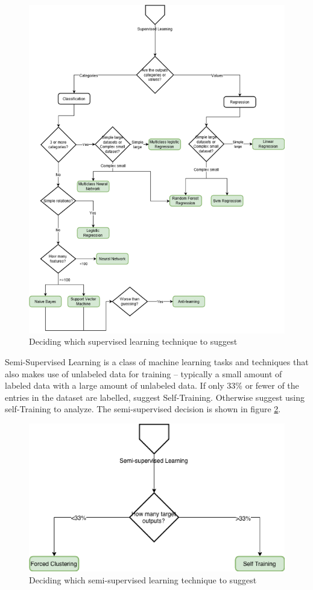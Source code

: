 \documentclass[a4paper,titlepage]{article}
\begin{document}
\begin{figure}[H]
  \centering
  \includegraphics[width=\textwidth]{supervised-decision}
  \caption{Deciding which supervised learning technique to suggest}
  \label{supervised-decision}
\end{figure} 


Semi-Supervised Learning is a class of machine learning tasks and techniques that also makes use of unlabeled data for training – typically a small amount of labeled data with a large amount of unlabeled data.
If only 33\% or fewer of the entries in the dataset are labelled, suggest Self-Training.
Otherwise suggest using self-Training to analyze.
The semi-supervised decision is shown in figure \ref{semisupervised-decision}.

\begin{figure}[H]
  \centering
  \includegraphics[width=\textwidth]{semi-supervised}
  \caption{Deciding which semi-supervised learning technique to suggest}
  \label{semisupervised-decision}
\end{figure}
\end{document}
